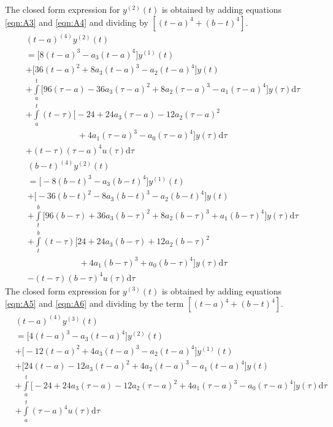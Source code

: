 \documentclass[letterpaper%
, twoside%
, 12pt%
,memoire%
, english%
,creativecommons,hyperref%
]{thETS}
\theoremstyle{newThmStyle}
\begin{document}
The closed form expression for $y^{(2)}(t)$ is obtained by adding equations \eqref{eqn:A3} and \eqref{eqn:A4} and dividing by $[(t-a)^{4}+(b-t)^{4}]$.
\begin{equation}\label{eqn:A3}
\begin{split}
	&(t-a)^{(4)}y^{(2)}(t)\\
	&=\bigg[8(t-a)^{3}-a_3(t-a)^{4}\bigg]y^{(1)}(t)\\&+\bigg[36(t-a)^{2}+8a_3(t-a)^{3}-a_2(t-a)^{4}\bigg]y(t)\\
	&+\int\limits_{a}^{t}\bigg[96(\tau-a)-36a_3(\tau-a)^{2}+8a_2(\tau-a)^{3}-a_1(\tau-a)^{4}\bigg]y(\tau)\mathrm{d}\tau\\
	&+\int\limits_{a}^{t}(t-\tau)\bigg[-24+24a_3(\tau-a)-12a_2(\tau-a)^{2}
	\\&\qquad\qquad\qquad{}+4a_1(\tau-a)^{3}-a_0(\tau-a)^{4}\bigg]y(\tau)\mathrm{d}\tau\\
	&+(t-\tau)(\tau-a)^{4}u(\tau)\mathrm{d}\tau
\end{split}
\end{equation}
\begin{equation}\label{eqn:A4}
\begin{split}
	&(b-t)^{(4)}y^{(2)}(t)\\
	&=\bigg[-8(b-t)^{3}-a_3(b-t)^{4}\bigg]y^{(1)}(t)\\&+\bigg[-36(b-t)^{2}-8a_3(b-t)^{3}-a_2(b-t)^{4}\bigg]y(t)\\
	&+\int\limits_{t}^{b}\bigg[96(b-\tau)+36a_3(b-\tau)^{2}+8a_2(b-\tau)^{3}+a_1(b-\tau)^{4}\bigg]y(\tau)\mathrm{d}\tau\\
	&+\int\limits_{t}^{b}(t-\tau)\bigg[24+24a_3(b-\tau)+12a_2(b-\tau)^{2}
	\\&\qquad\qquad\qquad{}+4a_1(b-\tau)^{3}+a_0(b-\tau)^{4}\bigg]y(\tau)\mathrm{d}\tau\\
	&-(t-\tau)(b-\tau)^{4}u(\tau)\mathrm{d}\tau
\end{split}
\end{equation}
The closed form expression for $y^{(3)}(t)$ is obtained by adding equations \eqref{eqn:A5} and \eqref{eqn:A6} and dividing by the term $[(t-a)^{4}+(b-t)^{4}]$.
\begin{equation}\label{eqn:A5}
\begin{split}
	&(t-a)^{(4)}y^{(3)}(t)\\
	&=\bigg[4(t-a)^{3} - a_3(t-a)^{4}\bigg]y^{(2)}(t)\\
	&+\bigg[-12(t-a)^{2}+4a_3(t-a)^{3}-a_2(t-a)^{4}\bigg]y^{(1)}(t)\\
	&+\bigg[24(t-a)-12a_3(t-a)^{2}+4a_2(t-a)^{3}-a_1(t-a)^{4}\bigg]y(t)\\
	&+\int\limits_{a}^{t}\bigg[-24+24a_3(\tau-a)-12a_2(\tau-a)^{2}+4a_1(\tau-a)^{3}-a_0(\tau-a)^{4}\bigg]y(\tau)\mathrm{d}\tau\\
	&+\int\limits_{a}^{t}(\tau-a)^{4}u(\tau)\mathrm{d}\tau
\end{split}
\end{equation}
\end{document}
